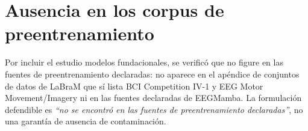 \section*{Ausencia en los corpus de preentrenamiento}

Por incluir el estudio modelos fundacionales, se verificó que \openbmi{} no figure
en las fuentes de preentrenamiento declaradas: no aparece en el apéndice de
conjuntos de datos de LaBraM que sí lista BCI Competition IV-1 y EEG Motor
Movement/Imagery ni en las fuentes declaradas de EEGMamba. La formulación
defendible es \emph{``no se encontró en las fuentes de preentrenamiento
declaradas''}, no una garantía de ausencia de contaminación.



